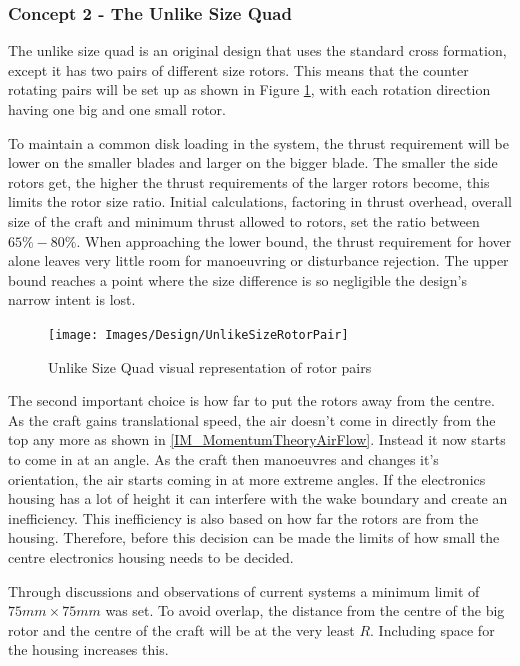 			\subsubsection{Concept 2 - The Unlike Size Quad}
			The unlike size quad is an original design that uses the standard cross formation, except it has two pairs of different size rotors. This means that the counter rotating pairs will be set up as shown in Figure \ref{IM_UnlikeSizePair}, with each rotation direction having one big and one small rotor. 
			
			To maintain a common disk loading in the system, the thrust requirement will be lower on the smaller blades and larger on the bigger blade. The smaller the side rotors get, the higher the thrust requirements of the larger rotors become, this limits the rotor size ratio. Initial calculations, factoring in thrust overhead, overall size of the craft and minimum thrust allowed to rotors, set the ratio between $65\% - 80\%$.  When approaching the lower bound, the thrust requirement for hover alone leaves very little room for manoeuvring or disturbance rejection. The upper bound reaches a point where the size difference is so negligible the design's narrow intent is lost.
			
			\begin{figure}[H]
			\centering
			\texttt{[image: Images/Design/UnlikeSizeRotorPair]}
			\caption{Unlike Size Quad visual representation of rotor pairs}
			\label{IM_UnlikeSizePair}
			\end{figure}
			
			The second important choice is how far to put the rotors away from the centre. As the craft gains translational speed, the air doesn't come in directly from the top any more as shown in \ref{IM_MomentumTheoryAirFlow}. Instead it now starts to come in at an angle. As the craft then manoeuvres and changes it's orientation, the air starts coming in at more extreme angles. If the electronics housing has a lot of height it can interfere with the wake boundary and create an inefficiency. This inefficiency is also based on how far the rotors are from the housing. Therefore, before this decision can be made the limits of how small the centre electronics housing needs to be decided. 
			
			Through discussions and observations of current systems a minimum limit of $75mm \times 75mm$ was set. To avoid overlap, the distance from the centre of the big rotor and the centre of the craft will be at the very least $R$. Including space for the housing increases this.
			
